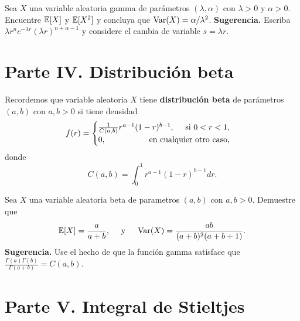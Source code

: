 \documentclass[12pt,a4paper]{article}
\begin{document}
    \begin{mdframed}[style=mdpinkbox,frametitle={Ejercicio 5}]
        Sea $X$ una variable aleatoria gamma de parámetros $(\lambda,\alpha)$ con $\lambda\gt0$ y $\alpha\gt0$. Encuentre
        $\mathbb{E}[X]$ y $\mathbb{E}[X^{2}]$ y concluya que $\operatorname{Var}(X)=\alpha/\lambda^{2}$. \textbf{Sugerencia.} Escriba $\lambda r^{n}e^{-\lambda r}(\lambda r)^{n+\alpha-1}$
        y considere el cambia de variable $s=\lambda r$.
    \end{mdframed}

    \section*{Parte IV. Distribución beta}

    Recordemos que variable aleatoria $X$ tiene \textbf{distribución beta} de parámetros $(a,b)$ con $a,b\gt0$ si tiene densidad
    \begin{equation*}
        f(r)=
        \begin{cases}
            \frac{1}{C(a,b)}r^{a-1}(1-r)^{b-1},\quad\text{ si }0\lt r\lt 1,\\
            0,\hfill\text{en cualquier otro caso},
        \end{cases}
    \end{equation*}
    donde
    \begin{equation*}
        C(a,b)=\int_{0}^{1}r^{a-1}(1-r)^{b-1}dr.
    \end{equation*}

    \begin{mdframed}[style=mdpinkbox,frametitle={Ejercicio 6}]
        Sea $X$ una variable aleatoria beta de parametros $(a,b)$ con $a,b\gt0$. Demuestre que
        \begin{equation*}
            \mathbb{E}[X]=\frac{a}{a+b},\quad\text{ y }\quad\operatorname{Var}(X)=\frac{ab}{(a+b)^{2}(a+b+1)}.
        \end{equation*}
        \textbf{Sugerencia.} Use el hecho de que la función  gamma satisface que $\frac{\Gamma(a)\Gamma(b)}{\Gamma(a+b)}=C(a,b)$.
    \end{mdframed}

    \section*{Parte V. Integral de Stieltjes}
\end{document}
